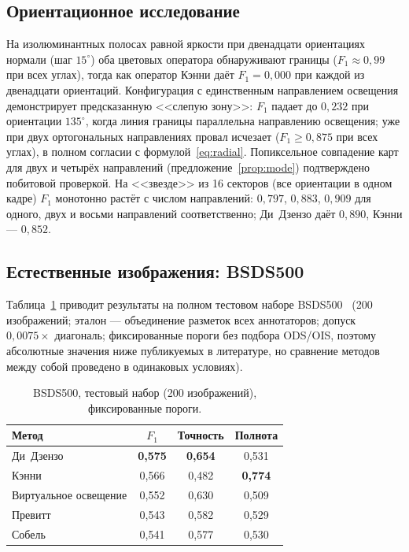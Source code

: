 \documentclass[11pt,a4paper]{article}
\theoremstyle{plain}
\theoremstyle{definition}
\theoremstyle{remark}
\begin{document}
\subsection{Ориентационное исследование}

На изолюминантных полосах равной яркости при двенадцати ориентациях нормали
(шаг $15^\circ$) оба цветовых оператора обнаруживают границы
($F_1 \approx 0{,}99$ при всех углах), тогда как оператор Кэнни даёт
$F_1 = 0{,}000$ при каждой из двенадцати ориентаций. Конфигурация с
единственным направлением освещения демонстрирует предсказанную <<слепую
зону>>: $F_1$ падает до $0{,}232$ при ориентации $135^\circ$, когда линия
границы параллельна направлению освещения; уже при двух ортогональных
направлениях провал исчезает ($F_1 \ge 0{,}875$ при всех углах), в полном
согласии с формулой~\eqref{eq:radial}. Попиксельное совпадение карт для
двух и четырёх направлений (предложение~\ref{prop:mode}) подтверждено
побитовой проверкой. На <<звезде>> из 16 секторов (все ориентации в одном
кадре) $F_1$ монотонно растёт с числом направлений: $0{,}797$, $0{,}883$,
$0{,}909$ для одного, двух и восьми направлений соответственно; Ди~Дзензо
даёт $0{,}890$, Кэнни --- $0{,}852$.

\subsection{Естественные изображения: BSDS500}

Таблица~\ref{tab:bsds} приводит результаты на полном тестовом наборе
BSDS500~\cite{arbelaez2011} (200 изображений; эталон --- объединение
разметок всех аннотаторов; допуск $0{,}0075 \times$ диагональ; фиксированные
пороги без подбора ODS/OIS, поэтому абсолютные значения ниже публикуемых в
литературе, но сравнение методов между собой проведено в одинаковых
условиях).

\begin{table}[h]
\centering
\caption{BSDS500, тестовый набор (200 изображений), фиксированные пороги.}
\label{tab:bsds}
\begin{tabular}{lccc}
\toprule
Метод & $F_1$ & Точность & Полнота \\
\midrule
Ди~Дзензо                   & \textbf{0{,}575} & \textbf{0{,}654} & 0{,}531 \\
Кэнни                       & 0{,}566 & 0{,}482 & \textbf{0{,}774} \\
Виртуальное освещение       & 0{,}552 & 0{,}630 & 0{,}509 \\
Превитт                     & 0{,}543 & 0{,}582 & 0{,}529 \\
Собель                      & 0{,}541 & 0{,}577 & 0{,}530 \\
\bottomrule
\end{tabular}
\end{table}
\end{document}
